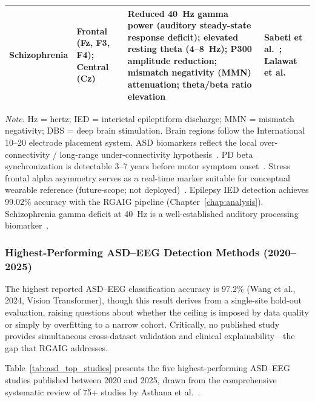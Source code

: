 \begin{table}[H]
\begin{tabularx}{\textwidth}{@{} >{\raggedright\arraybackslash}p{2.0cm} >{\raggedright\arraybackslash}p{2.0cm} L L @{}}
\addlinespace
Schizophrenia & Frontal (Fz, F3, F4); Central (Cz) & Reduced 40~Hz gamma power (auditory steady-state response deficit); elevated resting theta (4--8~Hz); P300 amplitude reduction; mismatch negativity (MMN) attenuation; theta/beta ratio elevation & Sabeti et al.~\cite{sabeti2009entropy}; Lalawat et al.~\cite{lalawat2025fmri} \\
\bottomrule
\end{tabularx}
\vspace{0.5em}\noindent\textit{Note.} Hz = hertz; IED = interictal epileptiform discharge; MMN = mismatch negativity; DBS = deep brain stimulation. Brain regions follow the International 10--20 electrode placement system. ASD biomarkers reflect the local over-connectivity / long-range under-connectivity hypothesis~\cite{duffy2012coherence}. PD beta synchronization is detectable 3--7 years before motor symptom onset~\cite{geraedts2018eeg}. Stress frontal alpha asymmetry serves as a real-time marker suitable for conceptual wearable reference (future-scope; not deployed)~\cite{arpaia2020wearable}. Epilepsy IED detection achieves 99.02\% accuracy with the RGAIG pipeline (Chapter~\ref{chap:analysis}). Schizophrenia gamma deficit at 40~Hz is a well-established auditory processing biomarker~\cite{sabeti2009entropy}.
\end{table}
\fi %


\subsubsection{Highest-Performing ASD--EEG Detection Methods (2020--2025)}

The highest reported ASD--EEG classification accuracy is 97.2\% (Wang et al., 2024, Vision Transformer), though this result derives from a single-site hold-out evaluation, raising questions about whether the ceiling is imposed by data quality or simply by overfitting to a narrow cohort. Critically, no published study provides simultaneous cross-dataset validation and clinical explainability---the gap that RGAIG addresses.

Table~\ref{tab:asd_top_studies} presents the five highest-performing ASD--EEG studies published between 2020 and 2025, drawn from the comprehensive systematic review of 75+ studies by Asthana et al.~\cite{asthana2025asd}.

